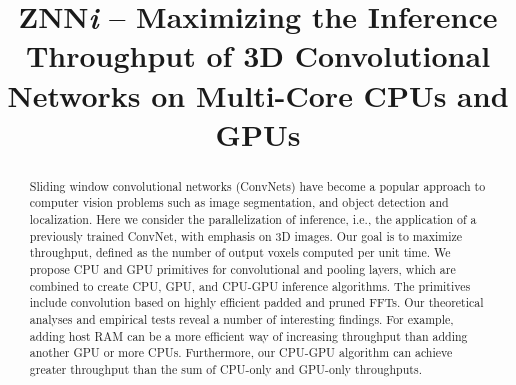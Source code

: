 \documentclass[conference]{IEEEtran}
\begin{document}

\title{ZNN\emph{i} -- Maximizing the Inference Throughput of 3D
  Convolutional Networks on Multi-Core CPUs and GPUs}

\author{
  \and {}
  }


\maketitle



\begin{abstract}
Sliding window convolutional networks (ConvNets) have become a popular
approach to computer vision problems such as image segmentation, and
object detection and localization. Here we consider the
parallelization of inference, i.e., the application of a previously
trained ConvNet, with emphasis on 3D images.  Our goal is to maximize
throughput, defined as the number of output voxels computed per unit
time.  We propose CPU and GPU primitives for convolutional and pooling
layers, which are combined to create CPU, GPU, and CPU-GPU inference
algorithms.  The primitives include convolution based on highly
efficient padded and pruned FFTs. Our theoretical analyses and
empirical tests reveal a number of interesting findings.  For example,
adding host RAM can be a more efficient way of increasing throughput
than adding another GPU or more CPUs.  Furthermore, our CPU-GPU
algorithm can achieve greater throughput than the sum of CPU-only and
GPU-only throughputs.
\end{abstract}
\end{document}
